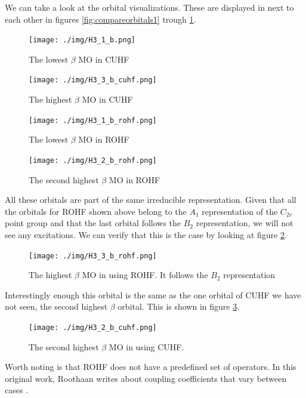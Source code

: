 We can take a look at the orbital visualizations.  These are displayed in next to each other in figures \ref{fig:compareorbitals1}
trough \ref{fig:compareorbitals4}. \\
\begin{figure}[H]
  \begin{minipage}[b]{0.5\linewidth}
    \texttt{[image: ./img/H3\_1\_b.png]}
    \caption{The lowest $\beta$ MO in CUHF}
    \label{fig:compareorbitals1}
  \end{minipage}
  \begin{minipage}[b]{0.5\linewidth}
    \texttt{[image: ./img/H3\_3\_b\_cuhf.png]}
    \caption{The highest $\beta$ MO in CUHF}
    \label{fig:compareorbitals2}
  \end{minipage}
  \begin{minipage}[b]{0.5\linewidth}
    \texttt{[image: ./img/H3\_1\_b\_rohf.png]}
    \caption{The lowest $\beta$ MO in ROHF}
    \label{fig:compareorbitals3}
  \end{minipage}
  \begin{minipage}[b]{0.5\linewidth}
    \texttt{[image: ./img/H3\_2\_b\_rohf.png]}
    \caption{The second highest $\beta$ MO in ROHF}
    \label{fig:compareorbitals4}
  \end{minipage}
\end{figure}
All these orbitals are part of the same irreducible representation. Given that all the orbitals for ROHF shown above belong to
the $A_1$ representation of the $C_{2v}$ point group and that the last orbital follows the $B_2$ representation, we will not see any excitations. We can verify that this is the case
by looking at figure \ref{fig:rohforbitalb2}.
\begin{figure}[H]
 \centering
  \texttt{[image: ./img/H3\_3\_b\_rohf.png]}
  \caption{The highest $\beta$ MO in  using ROHF. It follows the $B_2$ representation}
  \label{fig:rohforbitalb2}
\end{figure}
Interestingly enough this orbital is the same as the one orbital of CUHF we have not seen, the second highest $\beta$ orbital. This is shown in
figure \ref{fig:cuhforbitalb2}.
\begin{figure}
    \centering
  \texttt{[image: ./img/H3\_2\_b\_cuhf.png]}
  \caption{The second highest $\beta$ MO in  using CUHF.}
  \label{fig:cuhforbitalb2}
\end{figure}
Worth noting is that ROHF does not have a predefined set of operators. In this original work, Roothaan writes about coupling coefficients that vary between cases \cite{Roothaan1960}.
